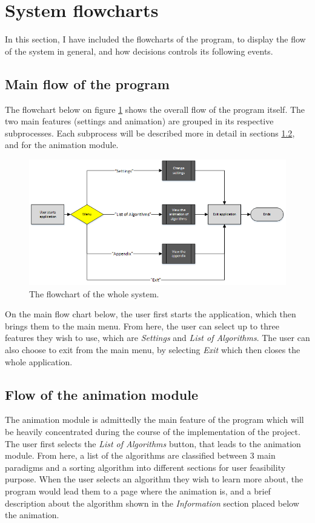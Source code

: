 \newpage

\section{System flowcharts}
In this section, I have included the flowcharts of the program, to display the flow of the system in general, and how decisions controls its following events. 

\subsection{Main flow of the program}
The flowchart below on figure \ref{mainFlowChart} shows the overall flow of the program itself. The two main features (settings and animation) are grouped in its respective subprocesses. Each subprocess will be described more in detail in sections \ref{sec:flowchartAnimation}, and for the animation module.

\begin{figure}[H]
\centering
\hspace*{-1cm}
\includegraphics[scale=1]{images/report_images/flowchartMain.png}
\caption{The flowchart of the whole system.}
\label{mainFlowChart}
\end{figure}

On the main flow chart below, the user first starts the application, which then brings them to the main menu. From here, the user can select up to three features they wish to use, which are \textit{Settings} and \textit{List of Algorithms}. The user can also choose to exit from the main menu, by selecting \textit{Exit} which then closes the whole application.

\subsection{Flow of the animation module} \label{sec:flowchartAnimation}
The animation module is admittedly the main feature of the program which will be heavily concentrated during the course of the implementation of the project. The user first selects the \textit{List of Algorithms} button, that leads to the animation module. From here, a list of the algorithms are classified between 3 main paradigms and a sorting algorithm into different sections for user feasibility purpose. When the user selects an algorithm they wish to learn more about, the program would lead them to a page where the animation is, and a brief description about the algorithm shown in the \textit{Information} section placed below the animation. 

